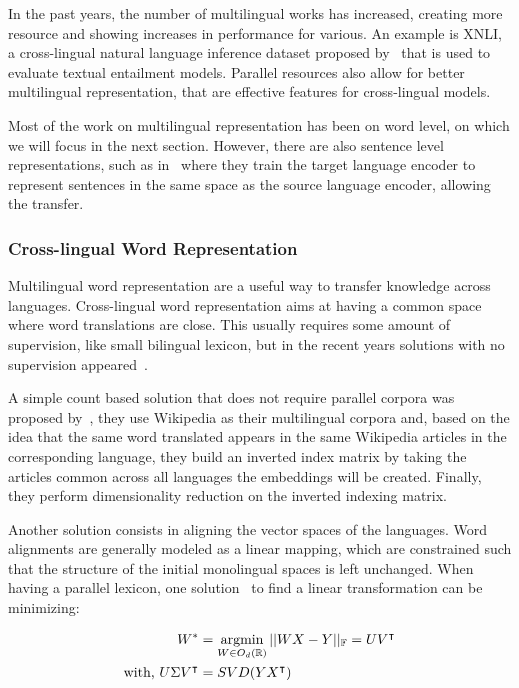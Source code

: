 In the past years, the number of multilingual works has increased, creating more resource and showing increases in performance for various. An example is XNLI, a cross-lingual natural language inference dataset proposed by~\cite{conneau2018xnli} that is used to evaluate textual entailment models. Parallel resources also allow for better multilingual representation, that are effective features for cross-lingual models.

Most of the work on multilingual representation has been on word level, on which we will focus in the next section. However, there are also sentence level representations, such as in~\citep{conneau2018xnli} where they train the target language encoder to represent sentences in the same space as the source language encoder, allowing the transfer.   

\subsubsection{Cross-lingual Word Representation}

Multilingual word representation are a useful way to transfer knowledge across languages. Cross-lingual word representation aims at having a common space where word translations are close. This usually requires some amount of supervision, like small bilingual lexicon, but in the recent years solutions with no supervision appeared~\citep{lample2018translation}.

A simple count based solution that does not require parallel corpora was proposed by~\cite{sogaard2015inverted}, they use Wikipedia as their multilingual corpora and, based on the idea that the same word translated appears in the same Wikipedia articles in the corresponding language, they build an inverted index matrix by taking the articles common across all languages the embeddings will be created. Finally, they perform dimensionality reduction on the inverted indexing matrix.

Another solution consists in aligning the vector spaces of the languages. Word alignments are generally modeled as a linear mapping, which are constrained such that the structure of the initial monolingual spaces is left unchanged. When having a parallel lexicon, one solution~\citep{mikolov2013exploiting} to find a linear transformation can be minimizing:

\begin{equation}
\begin{split}
    W^* & = \operatorname*{argmin}_{W \in O_d(\mathbb{R})} ||WX-Y||_\mathbb{F} = UV^{\intercal} \\
    \text{with, } U\Sigma V^\intercal & = SVD(YX^\intercal) 
\end{split}
    \label{eq:word_alignment}
\end{equation}

